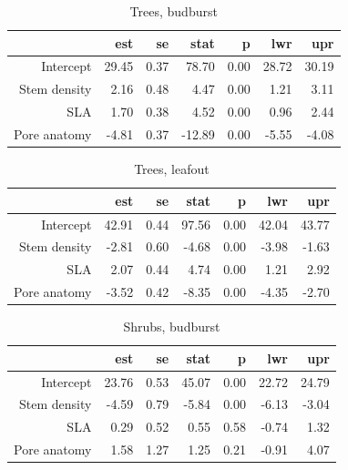 \documentclass{article}
\begin{document}
\begin{table}[ht]
\centering
\caption{Trees, budburst} 
\begin{tabular}{rrrrrrr}
  \hline
 & est & se & stat & p & lwr & upr \\ 
  \hline
Intercept & 29.45 & 0.37 & 78.70 & 0.00 & 28.72 & 30.19 \\ 
  Stem density & 2.16 & 0.48 & 4.47 & 0.00 & 1.21 & 3.11 \\ 
  SLA & 1.70 & 0.38 & 4.52 & 0.00 & 0.96 & 2.44 \\ 
  Pore anatomy & -4.81 & 0.37 & -12.89 & 0.00 & -5.55 & -4.08 \\ 
   \hline
\end{tabular}
\end{table}%
\begin{table}[ht]
\centering
\caption{Trees, leafout} 
\begin{tabular}{rrrrrrr}
  \hline
 & est & se & stat & p & lwr & upr \\ 
  \hline
Intercept & 42.91 & 0.44 & 97.56 & 0.00 & 42.04 & 43.77 \\ 
  Stem density & -2.81 & 0.60 & -4.68 & 0.00 & -3.98 & -1.63 \\ 
  SLA & 2.07 & 0.44 & 4.74 & 0.00 & 1.21 & 2.92 \\ 
  Pore anatomy & -3.52 & 0.42 & -8.35 & 0.00 & -4.35 & -2.70 \\ 
   \hline
\end{tabular}
\end{table}%
\begin{table}[ht]
\centering
\caption{Shrubs, budburst} 
\begin{tabular}{rrrrrrr}
  \hline
 & est & se & stat & p & lwr & upr \\ 
  \hline
Intercept & 23.76 & 0.53 & 45.07 & 0.00 & 22.72 & 24.79 \\ 
  Stem density & -4.59 & 0.79 & -5.84 & 0.00 & -6.13 & -3.04 \\ 
  SLA & 0.29 & 0.52 & 0.55 & 0.58 & -0.74 & 1.32 \\ 
  Pore anatomy & 1.58 & 1.27 & 1.25 & 0.21 & -0.91 & 4.07 \\ 
   \hline
\end{tabular}
\end{table}%
\end{document}

